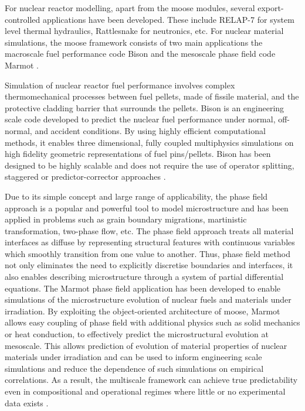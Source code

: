 	For nuclear reactor modelling, apart from the \gls{moose} modules, several export-controlled applications have been developed. These include {RELAP-7} \cite{Zhang:aa} for system level thermal hydraulics, {Rattlesnake} \cite{Wang:aa} for neutronics, etc. For nuclear material simulations, the {\gls{moose}} framework consists of two main applications the macroscale fuel performance code {Bison} \cite{WILLIAMSON2012149} and the mesoscale phase field code {Marmot}  \cite{Tonks12}. 
	
	Simulation of nuclear reactor fuel performance involves complex thermomechanical processes between fuel pellets, made of fissile material, and the protective cladding barrier that surrounds the pellets. {Bison} is an engineering scale code developed to predict the nuclear fuel performance under normal, off-normal, and accident conditions. By using highly efficient computational methods, it enables three dimensional, fully coupled multiphysics simulations on high fidelity geometric representations of fuel pins/pellets. {Bison} has been designed to be highly scalable and does not require the use of operator splitting, staggered or predictor-corrector approaches \cite{WILLIAMSON2012149}.

	Due to its simple concept and large range of applicability, the phase field approach is a popular and powerful tool to model microstructure and has been applied in problems such as grain boundary migrations, martinistic transformation, two-phase flow, etc. The phase field approach treats all material interfaces as diffuse by representing structural features with continuous variables which smoothly transition from one value to another. Thus, phase field method not only eliminates the need to explicitly discretise boundaries and interfaces, it also enables describing microstructure through a system of partial differential equations.  The {Marmot} phase field application has been developed to enable simulations of the microstructure evolution of nuclear fuels and materials under irradiation. By exploiting the object-oriented architecture of {\gls{moose}}, {Marmot} allows easy coupling of phase field with additional physics such as solid mechanics or heat conduction, to effectively predict the microstructural evolution at mesoscale. This allows prediction of evolution of material properties of nuclear materials under irradiation and can be used to inform engineering scale simulations and reduce the dependence of such simulations on empirical correlations. As a result, the multiscale framework can achieve true predictability even in compositional and operational regimes where little or no experimental data exists \cite{Tonks12}.

